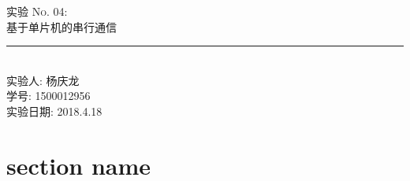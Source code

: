 
\newcommand{\labno}{04}
\newcommand{\labtitle}{基于单片机的串行通信}
\newcommand{\authorname}{杨庆龙}
\newcommand{\idnumber}{1500012956}
\newcommand{\labdate}{2018.4.18}



\begin{CJK}

\begin{titlepage}
\begin{center}
{\LARGE \textsc{实验 No. \labno:} \\ \vspace{4pt}}
{\Large \textsc{\labtitle} \\ \vspace{4pt}}
\rule[13pt]{\textwidth}{1pt} \\ \vspace{150pt}
{\large 实验人: \authorname \\ \vspace{10pt}
学号: \idnumber \\ \vspace{10pt}
实验日期: \labdate}
\end{center}
\end{titlepage}
\section{section name}

\end{CJK}


